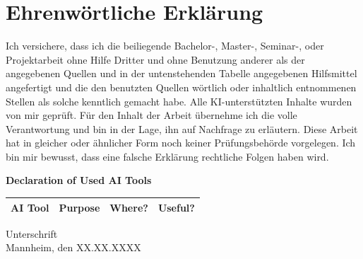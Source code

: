 \chapter{Ehrenwörtliche Erklärung}

Ich versichere, dass ich die beiliegende Bachelor-, Master-, Seminar-, oder
Projektarbeit ohne Hilfe Dritter und ohne Benutzung anderer als der angegebenen
Quellen und in der untenstehenden Tabelle angegebenen Hilfsmittel angefertigt
und die den benutzten Quellen wörtlich oder inhaltlich entnommenen Stellen als
solche kenntlich gemacht habe. Alle KI-unterstützten Inhalte wurden von mir
geprüft. Für den Inhalt der Arbeit übernehme ich die volle Verantwortung und bin
in der Lage, ihn auf Nachfrage zu erläutern. Diese Arbeit hat in gleicher oder
ähnlicher Form noch keiner Prüfungsbehörde vorgelegen. Ich bin mir bewusst, dass
eine falsche Erklärung rechtliche Folgen haben wird.

%
\begin{center}
  \textbf{Declaration of Used AI Tools} \\[.3em]
  \begin{tabularx}{\textwidth}{lXlc}
    \toprule
    AI Tool & Purpose & Where? & Useful? \\
    \midrule
    \bottomrule
  \end{tabularx}
\end{center}

\vspace{2cm}
\noindent Unterschrift\\
\noindent Mannheim, den XX.XX.XXXX \hfill
